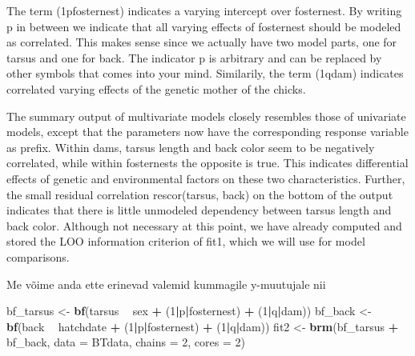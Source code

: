 \documentclass[]{article}
\newenvironment{Shaded}{\begin{snugshade}}{\end{snugshade}}
\newcommand{\KeywordTok}[1]{\textcolor[rgb]{0.13,0.29,0.53}{\textbf{#1}}}
\newcommand{\DataTypeTok}[1]{\textcolor[rgb]{0.13,0.29,0.53}{#1}}
\newcommand{\DecValTok}[1]{\textcolor[rgb]{0.00,0.00,0.81}{#1}}
\newcommand{\StringTok}[1]{\textcolor[rgb]{0.31,0.60,0.02}{#1}}
\newcommand{\OperatorTok}[1]{\textcolor[rgb]{0.81,0.36,0.00}{\textbf{#1}}}
\newcommand{\NormalTok}[1]{#1}
\begin{document}
The term (1\textbar{}p\textbar{}fosternest) indicates a varying
intercept over fosternest. By writing \textbar{}p\textbar{} in between
we indicate that all varying effects of fosternest should be modeled as
correlated. This makes sense since we actually have two model parts, one
for tarsus and one for back. The indicator p is arbitrary and can be
replaced by other symbols that comes into your mind. Similarily, the
term (1\textbar{}q\textbar{}dam) indicates correlated varying effects of
the genetic mother of the chicks.

The summary output of multivariate models closely resembles those of
univariate models, except that the parameters now have the corresponding
response variable as prefix. Within dams, tarsus length and back color
seem to be negatively correlated, while within fosternests the opposite
is true. This indicates differential effects of genetic and
environmental factors on these two characteristics. Further, the small
residual correlation rescor(tarsus, back) on the bottom of the output
indicates that there is little unmodeled dependency between tarsus
length and back color. Although not necessary at this point, we have
already computed and stored the LOO information criterion of fit1, which
we will use for model comparisons.

Me võime anda ette erinevad valemid kummagile y-muutujale nii

\begin{Shaded}
\begin{Highlighting}[]
\NormalTok{bf_tarsus <-}\StringTok{ }\KeywordTok{bf}\NormalTok{(tarsus }\OperatorTok{~}\StringTok{ }\NormalTok{sex }\OperatorTok{+}\StringTok{ }\NormalTok{(}\DecValTok{1}\OperatorTok{|}\NormalTok{p}\OperatorTok{|}\NormalTok{fosternest) }\OperatorTok{+}\StringTok{ }\NormalTok{(}\DecValTok{1}\OperatorTok{|}\NormalTok{q}\OperatorTok{|}\NormalTok{dam))}
\NormalTok{bf_back <-}\StringTok{ }\KeywordTok{bf}\NormalTok{(back }\OperatorTok{~}\StringTok{ }\NormalTok{hatchdate }\OperatorTok{+}\StringTok{ }\NormalTok{(}\DecValTok{1}\OperatorTok{|}\NormalTok{p}\OperatorTok{|}\NormalTok{fosternest) }\OperatorTok{+}\StringTok{ }\NormalTok{(}\DecValTok{1}\OperatorTok{|}\NormalTok{q}\OperatorTok{|}\NormalTok{dam))}
\NormalTok{fit2 <-}\StringTok{ }\KeywordTok{brm}\NormalTok{(bf_tarsus }\OperatorTok{+}\StringTok{ }\NormalTok{bf_back, }\DataTypeTok{data =}\NormalTok{ BTdata, }\DataTypeTok{chains =} \DecValTok{2}\NormalTok{, }\DataTypeTok{cores =} \DecValTok{2}\NormalTok{)}
\end{Highlighting}
\end{Shaded}
\end{document}
